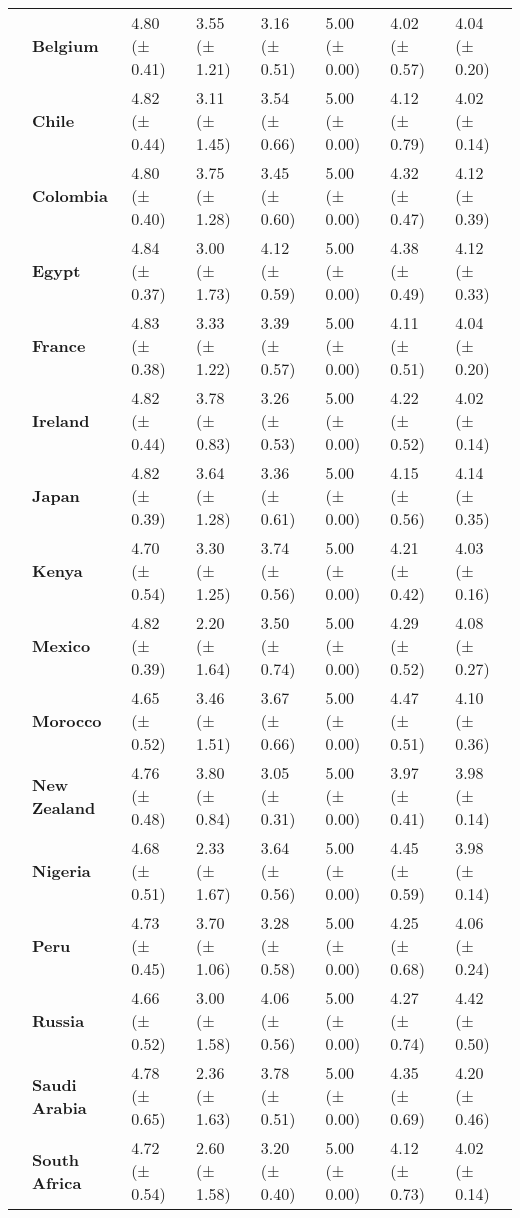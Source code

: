 \begin{longtable}{llllllll}
\textbf{} & \textbf{Belgium} & 4.80 (± 0.41) & 3.55 (± 1.21) & 3.16 (± 0.51) & 5.00 (± 0.00) & 4.02 (± 0.57) & 4.04 (± 0.20) \\
\textbf{} & \textbf{Chile} & 4.82 (± 0.44) & 3.11 (± 1.45) & 3.54 (± 0.66) & 5.00 (± 0.00) & 4.12 (± 0.79) & 4.02 (± 0.14) \\
\textbf{} & \textbf{Colombia} & 4.80 (± 0.40) & 3.75 (± 1.28) & 3.45 (± 0.60) & 5.00 (± 0.00) & 4.32 (± 0.47) & 4.12 (± 0.39) \\
\textbf{} & \textbf{Egypt} & 4.84 (± 0.37) & 3.00 (± 1.73) & 4.12 (± 0.59) & 5.00 (± 0.00) & 4.38 (± 0.49) & 4.12 (± 0.33) \\
\textbf{} & \textbf{France} & 4.83 (± 0.38) & 3.33 (± 1.22) & 3.39 (± 0.57) & 5.00 (± 0.00) & 4.11 (± 0.51) & 4.04 (± 0.20) \\
\textbf{} & \textbf{Ireland} & 4.82 (± 0.44) & 3.78 (± 0.83) & 3.26 (± 0.53) & 5.00 (± 0.00) & 4.22 (± 0.52) & 4.02 (± 0.14) \\
\textbf{} & \textbf{Japan} & 4.82 (± 0.39) & 3.64 (± 1.28) & 3.36 (± 0.61) & 5.00 (± 0.00) & 4.15 (± 0.56) & 4.14 (± 0.35) \\
\textbf{} & \textbf{Kenya} & 4.70 (± 0.54) & 3.30 (± 1.25) & 3.74 (± 0.56) & 5.00 (± 0.00) & 4.21 (± 0.42) & 4.03 (± 0.16) \\
\textbf{} & \textbf{Mexico} & 4.82 (± 0.39) & 2.20 (± 1.64) & 3.50 (± 0.74) & 5.00 (± 0.00) & 4.29 (± 0.52) & 4.08 (± 0.27) \\
\textbf{} & \textbf{Morocco} & 4.65 (± 0.52) & 3.46 (± 1.51) & 3.67 (± 0.66) & 5.00 (± 0.00) & 4.47 (± 0.51) & 4.10 (± 0.36) \\
\textbf{} & \textbf{New Zealand} & 4.76 (± 0.48) & 3.80 (± 0.84) & 3.05 (± 0.31) & 5.00 (± 0.00) & 3.97 (± 0.41) & 3.98 (± 0.14) \\
\textbf{} & \textbf{Nigeria} & 4.68 (± 0.51) & 2.33 (± 1.67) & 3.64 (± 0.56) & 5.00 (± 0.00) & 4.45 (± 0.59) & 3.98 (± 0.14) \\
\textbf{} & \textbf{Peru} & 4.73 (± 0.45) & 3.70 (± 1.06) & 3.28 (± 0.58) & 5.00 (± 0.00) & 4.25 (± 0.68) & 4.06 (± 0.24) \\
\textbf{} & \textbf{Russia} & 4.66 (± 0.52) & 3.00 (± 1.58) & 4.06 (± 0.56) & 5.00 (± 0.00) & 4.27 (± 0.74) & 4.42 (± 0.50) \\
\textbf{} & \textbf{Saudi Arabia} & 4.78 (± 0.65) & 2.36 (± 1.63) & 3.78 (± 0.51) & 5.00 (± 0.00) & 4.35 (± 0.69) & 4.20 (± 0.46) \\
\textbf{} & \textbf{South Africa} & 4.72 (± 0.54) & 2.60 (± 1.58) & 3.20 (± 0.40) & 5.00 (± 0.00) & 4.12 (± 0.73) & 4.02 (± 0.14) \\

\end{longtable}
